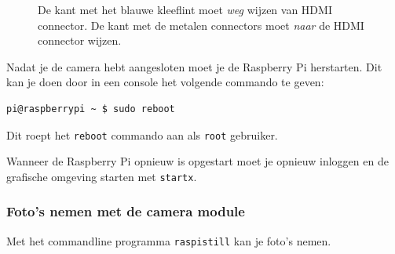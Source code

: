 \documentclass[a4paper]{article}
\begin{document}
\begin{figure}[h!]
\centering
{}
\caption{De kant met het blauwe kleeflint moet \emph{weg} wijzen van
HDMI connector.  De kant met de metalen connectors moet \emph{naar} de
HDMI connector wijzen.}
\label{fig:camera}
\end{figure}

    Nadat je de camera hebt aangesloten moet je de Raspberry Pi
herstarten.  Dit kan je doen door in een console het volgende commando
te geven:

\begin{lstlisting}
pi@raspberrypi ~ $ sudo reboot
\end{lstlisting}

    Dit roept het \texttt{reboot} commando aan als \texttt{root}
gebruiker.

    Wanneer de Raspberry Pi opnieuw is opgestart moet je opnieuw
inloggen en de grafische omgeving starten met \texttt{startx}.

    \subsubsection{Foto's nemen met de camera module}

      Met het commandline programma \texttt{raspistill} kan je foto's
nemen.
\end{document}
